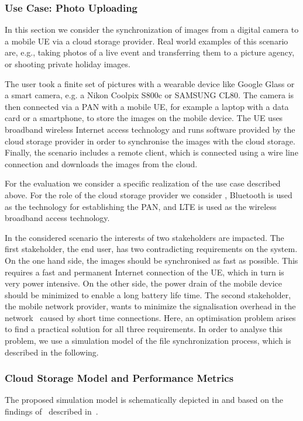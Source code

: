 \subsubsection*{Use Case: Photo Uploading}\label{sec:application:cloud_file_synchronisation:use_case}
In this section we consider the synchronization of images from a digital camera to a mobile \gls{UE} via a cloud storage provider.
Real world examples of this scenario are, e.g., taking photos of a live event and transferring them to a picture agency, or shooting private holiday images. 

The user took a finite set of pictures with a wearable device like Google Glass or a smart camera, e.g. a Nikon Coolpix S800c or SAMSUNG CL80.
The camera is then connected via a \gls{PAN} with a mobile \gls{UE}, for example a laptop with a data card or a smartphone, to store the images on the mobile device.
The \gls{UE} uses broadband wireless Internet access technology and runs software provided by the cloud storage provider in order to synchronise the images with the cloud storage.
Finally, the scenario includes a remote client, which is connected using a wire line connection and downloads the images from the cloud.

For the evaluation we consider a specific realization of the use case described above.
For the role of the cloud storage provider we consider \dropbox, Bluetooth is used as the technology for establishing the \gls{PAN}, and \gls{LTE} is used as the wireless broadband access technology.

In the considered scenario the interests of two stakeholders are impacted.
The first stakeholder, the end user, has two contradicting requirements on the system.
On the one hand side, the images should be synchronised as fast as possible. 
This requires a fast and permanent Internet connection of the \gls{UE}, which in turn is very power intensive.
On the other side, the power drain of the mobile device should be minimized to enable a long battery life time.
The second stakeholder, the mobile network provider, wants to minimize the signalisation overhead in the network~\cite{NSN2011, Huawei2011} caused by short time connections.
Here, an optimisation problem arises to find a practical solution for all three requirements. 
In order to analyse this problem, we use a simulation model of the file synchronization process, which is described in the following.

\subsubsection*{Cloud Storage Model and Performance Metrics}\label{sec:application:cloud_file_synchronisation:system_model:model_metrics}
The proposed simulation model is schematically depicted in  and based on the findings of~\cite{Drago2012} described in~.

